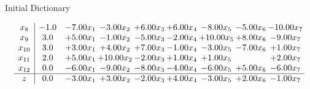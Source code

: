 \documentclass[8pt]{article}
\begin{document}
Initial Dictionary 

\[\begin{array}{c| c c@{\hskip 2pt} c@{\hskip 2pt} c@{\hskip 2pt} c@{\hskip 2pt} c@{\hskip 2pt} c@{\hskip 2pt} c@{\hskip 2pt} }
 x_{8}   &  -1.0 & -7.00 x_{1} & -3.00 x_{2} & +  6.00 x_{3} & +  6.00 x_{4} & -8.00 x_{5} & -5.00 x_{6} & -10.00 x_{7}\\
 x_{9}   &  3.0 & +  5.00 x_{1} & -1.00 x_{2} & -5.00 x_{3} & -2.00 x_{4} & + 10.00 x_{5} & +  8.00 x_{6} & -9.00 x_{7}\\
 x_{10}   &  3.0 & +  3.00 x_{1} & +  4.00 x_{2} & +  7.00 x_{3} & -1.00 x_{4} & -3.00 x_{5} & -7.00 x_{6} & +  1.00 x_{7}\\
 x_{11}   &  2.0 & +  5.00 x_{1} & + 10.00 x_{2} & -2.00 x_{3} & +  1.00 x_{4} & +  1.00 x_{5} &   & +  2.00 x_{7}\\
 x_{12}   &  0.0 & -6.00 x_{1} & -9.00 x_{2} & -8.00 x_{3} & -4.00 x_{4} & -6.00 x_{5} & +  5.00 x_{6} & -6.00 x_{7}\\
\hline
z    &  0.0 & -3.00 x_{1} & +  3.00 x_{2} & -2.00 x_{3} & +  4.00 x_{4} & -3.00 x_{5} & +  2.00 x_{6} & -1.00 x_{7}\\
\end{array}\]
\end{document}
